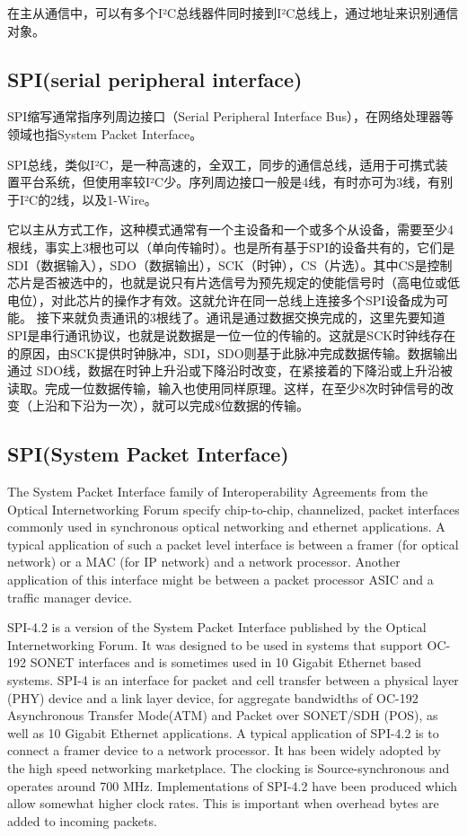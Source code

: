 在主从通信中，可以有多个I²C总线器件同时接到I²C总线上，通过地址来识别通信对象。


\subsection{SPI(serial peripheral interface)}
SPI缩写通常指序列周边接口（Serial Peripheral Interface Bus），在网络处理器等领域也指System Packet Interface。

SPI总线，类似I²C，是一种高速的，全双工，同步的通信总线，适用于可携式装置平台系统，但使用率较I²C少。序列周边接口一般是4线，有时亦可为3线，有别于I²C的2线，以及1-Wire。

它以主从方式工作，这种模式通常有一个主设备和一个或多个从设备，需要至少4根线，事实上3根也可以（单向传输时）。也是所有基于SPI的设备共有的，它们是SDI（数据输入），SDO（数据输出），SCK（时钟），CS（片选）。其中CS是控制芯片是否被选中的，也就是说只有片选信号为预先规定的使能信号时（高电位或低电位），对此芯片的操作才有效。这就允许在同一总线上连接多个SPI设备成为可能。
接下来就负责通讯的3根线了。通讯是通过数据交换完成的，这里先要知道SPI是串行通讯协议，也就是说数据是一位一位的传输的。这就是SCK时钟线存在的原因，由SCK提供时钟脉冲，SDI，SDO则基于此脉冲完成数据传输。数据输出通过 SDO线，数据在时钟上升沿或下降沿时改变，在紧接着的下降沿或上升沿被读取。完成一位数据传输，输入也使用同样原理。这样，在至少8次时钟信号的改变（上沿和下沿为一次），就可以完成8位数据的传输。


\subsection{SPI(System Packet Interface)}
The System Packet Interface family of Interoperability Agreements from the Optical Internetworking Forum specify chip-to-chip, channelized, packet interfaces commonly used in synchronous optical networking and ethernet applications. A typical application of such a packet level interface is between a framer (for optical network) or a MAC (for IP network) and a network processor. Another application of this interface might be between a packet processor ASIC and a traffic manager device.

SPI-4.2 is a version of the System Packet Interface published by the Optical Internetworking Forum. It was designed to be used in systems that support OC-192 SONET interfaces and is sometimes used in 10 Gigabit Ethernet based systems.
SPI-4 is an interface for packet and cell transfer between a physical layer (PHY) device and a link layer device, for aggregate bandwidths of OC-192 Asynchronous Transfer Mode(ATM) and Packet over SONET/SDH (POS), as well as 10 Gigabit Ethernet applications.
A typical application of SPI-4.2 is to connect a framer device to a network processor. It has been widely adopted by the high speed networking marketplace.
The clocking is Source-synchronous and operates around 700 MHz. Implementations of SPI-4.2 have been produced which allow somewhat higher clock rates. This is important when overhead bytes are added to incoming packets.




